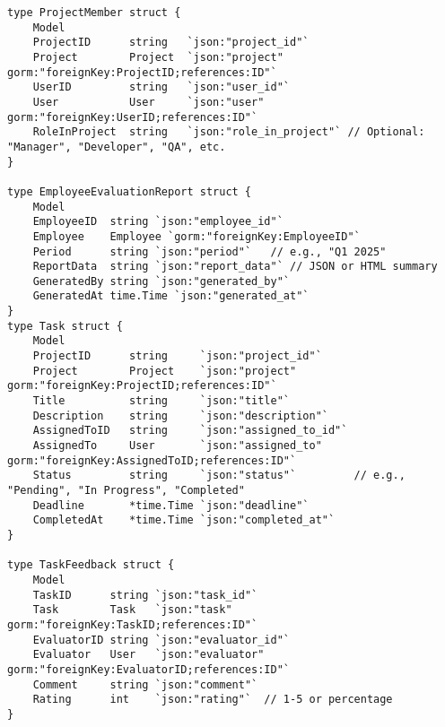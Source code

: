 \begin{lstlisting}[language=Golang, caption=Models, frame=single]
type ProjectMember struct {
	Model
	ProjectID      string   `json:"project_id"`
	Project        Project  `json:"project" gorm:"foreignKey:ProjectID;references:ID"`
	UserID         string   `json:"user_id"`
	User           User     `json:"user" gorm:"foreignKey:UserID;references:ID"`
	RoleInProject  string   `json:"role_in_project"` // Optional: "Manager", "Developer", "QA", etc.
}

type EmployeeEvaluationReport struct {
	Model
	EmployeeID  string `json:"employee_id"`
	Employee    Employee `gorm:"foreignKey:EmployeeID"`
	Period      string `json:"period"`   // e.g., "Q1 2025"
	ReportData  string `json:"report_data"` // JSON or HTML summary
	GeneratedBy string `json:"generated_by"`
	GeneratedAt time.Time `json:"generated_at"`
}
type Task struct {
	Model
	ProjectID      string     `json:"project_id"`
	Project        Project    `json:"project" gorm:"foreignKey:ProjectID;references:ID"`
	Title          string     `json:"title"`
	Description    string     `json:"description"`
	AssignedToID   string     `json:"assigned_to_id"`
	AssignedTo     User       `json:"assigned_to" gorm:"foreignKey:AssignedToID;references:ID"`
	Status         string     `json:"status"`         // e.g., "Pending", "In Progress", "Completed"
	Deadline       *time.Time `json:"deadline"`
	CompletedAt    *time.Time `json:"completed_at"`
}

type TaskFeedback struct {
	Model
	TaskID      string `json:"task_id"`
	Task        Task   `json:"task" gorm:"foreignKey:TaskID;references:ID"`
	EvaluatorID string `json:"evaluator_id"`
	Evaluator   User   `json:"evaluator" gorm:"foreignKey:EvaluatorID;references:ID"`
	Comment     string `json:"comment"`
	Rating      int    `json:"rating"`  // 1-5 or percentage
}


\end{lstlisting}
